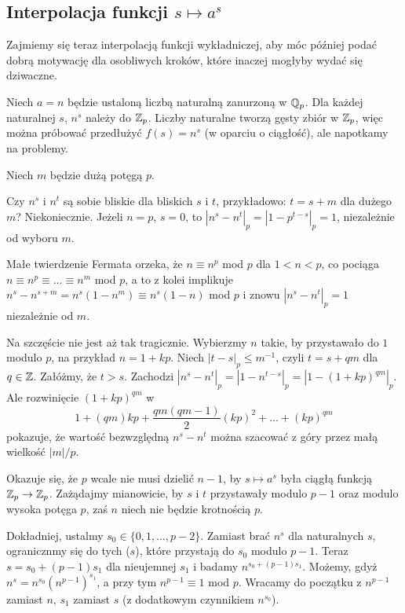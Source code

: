 \subsection{Interpolacja funkcji $s \mapsto a^s$}
Zajmiemy się teraz interpolacją funkcji wykładniczej, aby móc później podać dobrą motywację dla osobliwych kroków, które inaczej mogłyby wydać się dziwaczne.

Niech $a = n$ będzie ustaloną liczbą naturalną zanurzoną w $\mathbb Q_p$.
Dla każdej naturalnej $s$, $n^s$ należy do $\mathbb Z_p$.
Liczby naturalne tworzą gęsty zbiór w $\mathbb Z_p$, więc można próbować przedłużyć $f(s) = n^s$ (w oparciu o ciągłość), ale napotkamy na problemy.

Niech $m$ będzie dużą potęgą $p$.

Czy $n^s$ i $n^t$ są sobie bliskie dla bliskich $s$ i $t$, przykładowo: $t = s + m$ dla dużego $m$?
Niekoniecznie.
Jeżeli $n = p$, $s = 0$, to $|n^s - n^t|_p = |1 - p^{t-s}|_p = 1$, niezależnie od wyboru $m$.

Małe twierdzenie Fermata orzeka, że $n \equiv n^p$ mod $p$ dla $1 < n < p$, co pociąga $n \equiv n^p \equiv \ldots \equiv n^{m}$ mod $p$, a to z kolei implikuje $n^s - n^{s + m} = n^s(1 - n^m) \equiv n^s (1-n)$ mod $p$ i znowu $|n^s - n^t|_p = 1$ niezależnie od $m$.

Na szczęście nie jest aż tak tragicznie.
Wybierzmy $n$ takie, by przystawało do $1$ modulo $p$, na przykład $n = 1 + kp$.
Niech $|t - s|_p \le m^{-1}$, czyli $t = s + qm$ dla $q \in \mathbb Z$.
Załóżmy, że $t > s$.
Zachodzi $|n^s - n^t|_p = |1-n^{t-s}|_p = |1 - (1 + kp)^{qm}|_p$.
Ale rozwinięcie $(1 + kp)^{qm}$ w 
\[
	1 + (qm)kp + \frac{qm(qm - 1)}{2} (kp)^2 + \ldots + (kp)^{qm}
\]
pokazuje, że wartość bezwzględną $n^s - n^t$ można szacować z góry przez małą wielkość $|m| / p$.

Okazuje się, że $p$ wcale nie musi dzielić $n - 1$, by $s \mapsto a^s$ była ciągłą funkcją $\mathbb Z_p \to \mathbb Z_p$.
Zażądajmy mianowicie, by $s$ i $t$ przystawały modulo $p - 1$ oraz modulo wysoka potęga $p$, zaś $n$ niech nie będzie krotnością $p$.

Dokładniej, ustalmy $s_0 \in \{0, 1, \ldots, p -2\}$.
Zamiast brać $n^s$ dla naturalnych $s$, ogranicznmy się do tych ($s$), które przystają do $s_0$ modulo $p-1$.
Teraz $s = s_0 + (p-1)s_1$ dla nieujemnej $s_1$ i badamy $n^{s_0 + (p-1)s_1}$.
Możemy, gdyż $n^s = n^{s_0} (n^{p-1})^{s_1}$, a przy tym $n^{p-1} \equiv 1$ mod $p$.
Wracamy do początku z $n^{p-1}$ zamiast $n$, $s_1$ zamiast $s$ (z dodatkowym czynnikiem $n^{s_0}$).

